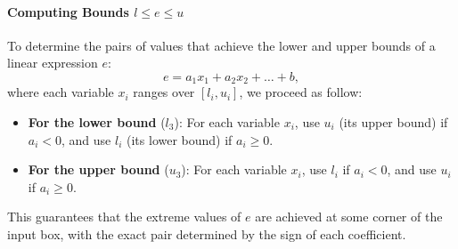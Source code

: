 \documentclass[oneside,11pt,dvipsnames]{book}
\numberwithin{equation}{section}
\theoremstyle{definition}
\theoremstyle{remark}
\begin{document}
\paragraph{Computing Bounds $l \le e \le u$}  To determine the pairs of values that achieve the lower and upper bounds of a linear expression $e$:
\[
 e = a_1 x_1 + a_2 x_2 + \ldots + b,
\]
where each variable $x_i$ ranges over $[l_i, u_i]$, we proceed as follow:

\begin{itemize}
    \item \textbf{For the lower bound} ($l_3$):
    For each variable $x_i$, use $u_i$ (its upper bound) if $a_i < 0$, and use $l_i$ (its lower bound) if $a_i \geq 0$.
    \item \textbf{For the upper bound} ($u_3$):
    For each variable $x_i$, use $l_i$ if $a_i < 0$, and use $u_i$ if $a_i \geq 0$.
\end{itemize}

This guarantees that the extreme values of $e$ are achieved at some corner of the input box, with the exact pair determined by the sign of each coefficient.
\end{document}
